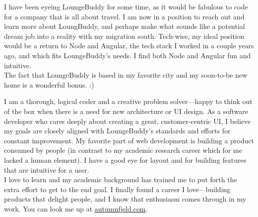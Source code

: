 \documentclass[11pt, a4paper]{awesome-cv}
\begin{document}
\begin{cvletter}

\vspace{-3pt}
I have been eyeing LoungeBuddy for some time, as it would be fabulous to code for a company that is all about travel. I am now in a position to reach out and learn more about LoungBuddy, and perhaps make what sounds like a potential dream job into a reality with my migration south. Tech-wise, my ideal position would be a return to Node and Angular, the tech stack I worked in a couple years ago, and which fits LoungeBuddy's needs.  I find both Node and Angular fun and intuitive.  
\vspace{6pt}
\\
The fact that LoungeBuddy is based in my favorite city and my soon-to-be new home is a wonderful bonus. :)

\vspace{-3pt}
I am a thorough, logical coder and a creative problem solver---happy to think out of the box when there is a need for new architecture or UI design.  As a software developer who cares deeply about creating a great, customer-centric UI, I believe my goals are closely aligned with LoungeBuddy's standards and efforts for constant improvement.  My favorite part of web development is building a product consumed by people (in contrast to my academic research career which for me lacked a human element). I have a good eye for layout and for building features that are intuitive for a user.
\vspace{6pt}
\\
I love to learn and my academic background has trained me to put forth the extra effort to get to the end goal. I finally found a career I love---building products that delight people, and I know that enthusiasm comes through in my work. You can look me up at \href{http://autumnfjeld.com}{autumnfjeld.com}.



\end{cvletter}

\makeletterclosing
\end{document}
